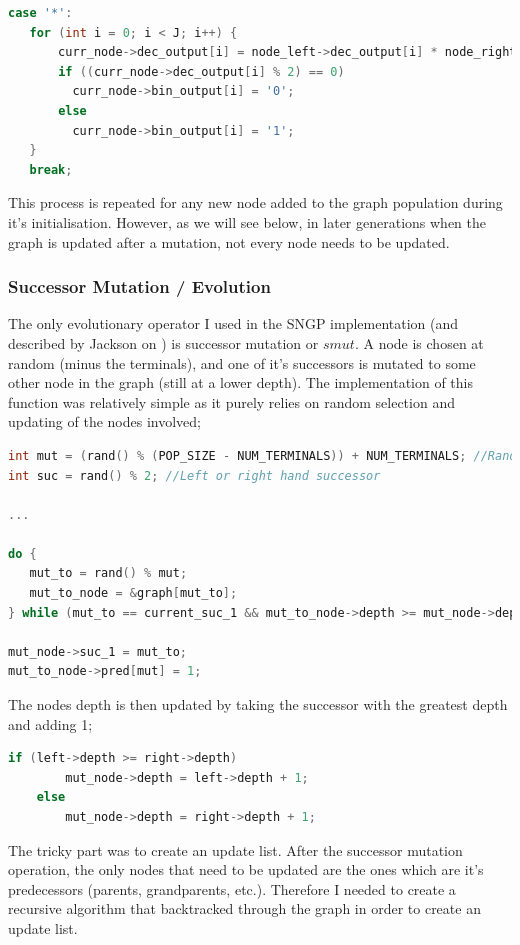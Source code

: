 \documentclass[a4paper,10.5pt]{article}
\begin{document}
\begin{lstlisting}[language=C]
case '*': 
   for (int i = 0; i < J; i++) {
       curr_node->dec_output[i] = node_left->dec_output[i] * node_right->dec_output[i];
       if ((curr_node->dec_output[i] % 2) == 0) 
         curr_node->bin_output[i] = '0';
       else
         curr_node->bin_output[i] = '1';        
   }
   break;
\end{lstlisting}

This process is repeated for any new node added to the graph population during it's initialisation. However, as we will see below, in later generations when the graph is updated after a mutation, not every node needs to be updated.

\subsubsection{Successor Mutation /  Evolution}
The only evolutionary operator I used in the SNGP implementation (and described by Jackson on \cite{jacksonsngp}) is successor mutation or $smut$. A node is chosen at random (minus the terminals), and one of it's successors is mutated to some other node in the graph (still at a lower depth). The implementation of this function was relatively simple as it purely relies on random selection and updating of the nodes involved;


\begin{lstlisting}[language=C]
int mut = (rand() % (POP_SIZE - NUM_TERMINALS)) + NUM_TERMINALS; //Randomly pick node in graph (excluding terminals)
int suc = rand() % 2; //Left or right hand successor

...

do {
   mut_to = rand() % mut;
   mut_to_node = &graph[mut_to];
} while (mut_to == current_suc_1 && mut_to_node->depth >= mut_node->depth);

mut_node->suc_1 = mut_to;
mut_to_node->pred[mut] = 1;
\end{lstlisting}

The nodes depth is then updated by taking the successor with the greatest depth and adding 1;

\begin{lstlisting}[language=C]
if (left->depth >= right->depth)
		mut_node->depth = left->depth + 1;
	else
		mut_node->depth = right->depth + 1;
\end{lstlisting}

The tricky part was to create an update list. After the successor mutation operation, the only nodes that need to be updated are the ones which are it's predecessors (parents, grandparents, etc.). Therefore I needed to create a recursive algorithm that backtracked through the graph in order to create an update list.
\end{document}
